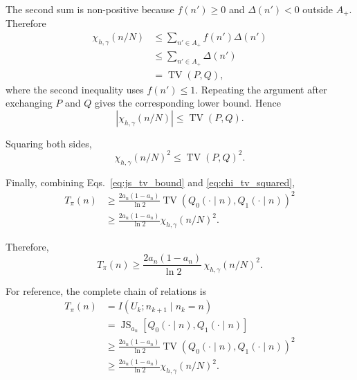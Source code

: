 The second sum is non-positive because \(f(n')\ge0\) and
\(\Delta(n')<0\) outside \(A_+\). Therefore
\begin{align}
\chi_{h,\gamma}(n/N)
&\le
\sum_{n'\in A_+}
f(n')\Delta(n')
\nonumber\\
&\le
\sum_{n'\in A_+}
\Delta(n')
\nonumber\\
&=
\operatorname{TV}(P,Q),
\end{align}
where the second inequality uses \(f(n')\le1\).
Repeating the argument after exchanging \(P\) and \(Q\) gives the
corresponding lower bound. Hence
\begin{equation}
\boxed{
|\chi_{h,\gamma}(n/N)|
\le
\operatorname{TV}(P,Q).
}
\label{eq:chi_tv}
\end{equation}

Squaring both sides,
\begin{equation}
\chi_{h,\gamma}(n/N)^2
\le
\operatorname{TV}(P,Q)^2.
\label{eq:chi_tv_squared}
\end{equation}

Finally, combining Eqs.~\eqref{eq:js_tv_bound} and
\eqref{eq:chi_tv_squared},
\begin{align}
T_\pi(n)
&\ge
\frac{2a_n(1-a_n)}{\ln 2}
\operatorname{TV}
\left(
Q_0(\cdot\mid n),
Q_1(\cdot\mid n)
\right)^2
\nonumber\\[1mm]
&\ge
\frac{2a_n(1-a_n)}{\ln 2}
\chi_{h,\gamma}(n/N)^2.
\end{align}

Therefore,
\begin{equation}
\boxed{
T_\pi(n)
\ge
\frac{2a_n(1-a_n)}{\ln 2}\,
\chi_{h,\gamma}(n/N)^2.
}
\end{equation}

For reference, the complete chain of relations is
\begin{equation}
\boxed{
\begin{aligned}
T_\pi(n)
&=
I(U_k;n_{k+1}\mid n_k=n)
\\
&=
\operatorname{JS}_{a_n}
\left[
Q_0(\cdot\mid n),
Q_1(\cdot\mid n)
\right]
\\
&\ge
\frac{2a_n(1-a_n)}{\ln 2}
\operatorname{TV}
\left(
Q_0(\cdot\mid n),
Q_1(\cdot\mid n)
\right)^2
\\
&\ge
\frac{2a_n(1-a_n)}{\ln 2}
\chi_{h,\gamma}(n/N)^2.
\end{aligned}
}
\label{eq:complete_IR_chain}
\end{equation}

